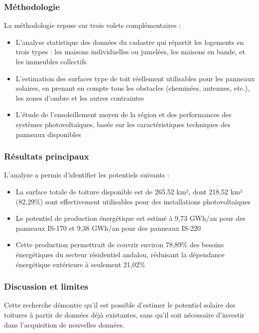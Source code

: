 \subsubsection{Méthodologie}
\par{La méthodologie repose sur trois volets complémentaires :}
\begin{itemize}
    \item L'analyse statistique des données du cadastre qui répartit les logements en trois types : les maisons individuelles ou jumelées, les maisons en bande, et les immeubles collectifs
    \item L'estimation des surfaces type de toit réellement utilisables pour les panneaux solaires, en prenant en compte tous les obstacles (cheminées, antennes, etc.), les zones d'ombre et les autres contraintes
    \item L'étude de l'ensoleillement moyen de la région et des performances des systèmes photovoltaïques, basée sur les caractéristiques techniques des panneaux disponibles
\end{itemize}

\subsubsection{Résultats principaux}
\par{L'analyse a permis d'identifier les potentiels suivants :}
\begin{itemize}
    \item La surface totale de toiture disponible est de 265,52 km², dont 218,52 km² (82,29\%) sont effectivement utilisables pour des installations photovoltaïques
    \item Le potentiel de production énergétique est estimé à 9,73 GWh/an pour des panneaux IS-170 et 9,38 GWh/an pour des panneaux IS-220
    \item Cette production permettrait de couvrir environ 78,89\% des besoins énergétiques du secteur résidentiel andalou, réduisant la dépendance énergétique extérieure à seulement 21,02\%
\end{itemize}

\subsubsection{Discussion et limites}
\par{Cette recherche démontre qu'il est possible d'estimer le potentiel solaire des toitures à partir de données déjà existantes, sans qu'il soit nécessaire d'investir dans l’acquisition de nouvelles données.}


